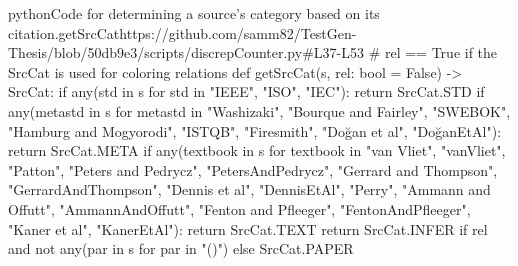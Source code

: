 \begin{codeSnippet}{python}{Code for determining a source's category based on its citation.}{getSrcCat}{https://github.com/samm82/TestGen-Thesis/blob/50db9e3/scripts/discrepCounter.py\#L37-L53}
# rel == True if the SrcCat is used for coloring relations
def getSrcCat(s, rel: bool = False) -> SrcCat:
    if any(std in s for std in {"IEEE", "ISO", "IEC"}):
        return SrcCat.STD
    if any(metastd in s for metastd in
        {"Washizaki", "Bourque and Fairley", "SWEBOK",
            "Hamburg and Mogyorodi", "ISTQB", "Firesmith",
            "Doğan et al", "DoğanEtAl"}):
        return SrcCat.META
    if any(textbook in s for textbook in
        {"van Vliet", "vanVliet", "Patton", "Peters and Pedrycz",
            "PetersAndPedrycz", "Gerrard and Thompson",
            "GerrardAndThompson", "Dennis et al", "DennisEtAl",
            "Perry", "Ammann and Offutt", "AmmannAndOffutt",
            "Fenton and Pfleeger", "FentonAndPfleeger",
            "Kaner et al", "KanerEtAl"}):
        return SrcCat.TEXT
    return SrcCat.INFER if rel and not any(par in s for par in "()") else SrcCat.PAPER
\end{codeSnippet}

\mainInvalidInputTest{}

\projViolationChoice{}

\projManualViolationReq{}

\exampleCode{}

\examplePseudocode{}
